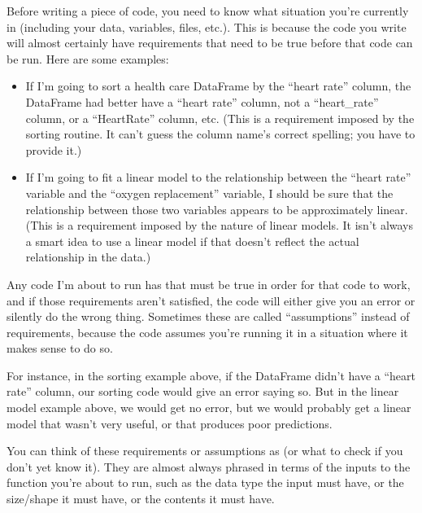 \documentclass[letterpaper,10pt,english]{jupyterBook}
\begin{document}
\sphinxAtStartPar
Before writing a piece of code, you need to know what situation you’re currently in (including your data, variables, files, etc.).  This is because the code you write will almost certainly have requirements that need to be true before that code can be run.  Here are some examples:
\begin{itemize}
\item {} 
\sphinxAtStartPar
If I’m going to sort a health care DataFrame by the “heart rate” column, the DataFrame had better have a “heart rate” column, not a “heart\_rate” column, or a “HeartRate” column, etc.  (This is a requirement imposed by the sorting routine.  It can’t guess the column name’s correct spelling; you have to provide it.)

\item {} 
\sphinxAtStartPar
If I’m going to fit a linear model to the relationship between the “heart rate” variable and the “oxygen replacement” variable, I should be sure that the relationship between those two variables appears to be approximately linear.  (This is a requirement imposed by the nature of linear models.  It isn’t always a smart idea to use a linear model if that doesn’t reflect the actual relationship in the data.)

\end{itemize}

\sphinxAtStartPar
Any code I’m about to run has  that must be true in order for that code to work, and if those requirements aren’t satisfied, the code will either give you an error or silently do the wrong thing.  Sometimes these are called “assumptions” instead of requirements, because the code assumes you’re running it in a situation where it makes sense to do so.

\sphinxAtStartPar
For instance, in the sorting example above, if the DataFrame didn’t have a “heart rate” column, our sorting code would give an error saying so.  But in the linear model example above, we would get no error, but we would probably get a linear model that wasn’t very useful, or that produces poor predictions.

\sphinxAtStartPar
You can think of these requirements or assumptions as  (or what to check if you don’t yet know it).  They are almost always phrased in terms of the inputs to the function you’re about to run, such as the data type the input must have, or the size/shape it must have, or the contents it must have.
\end{document}
